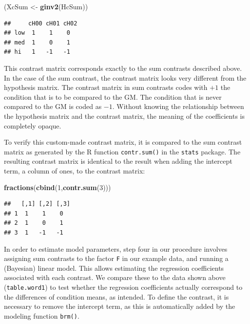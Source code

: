 \documentclass[12pt,]{krantz}
\newenvironment{Shaded}{\begin{snugshade}}{\end{snugshade}}
\newcommand{\DecValTok}[1]{\textcolor[rgb]{0.00,0.00,0.81}{#1}}
\newcommand{\KeywordTok}[1]{\textcolor[rgb]{0.13,0.29,0.53}{\textbf{#1}}}
\newcommand{\NormalTok}[1]{#1}
\newcommand{\StringTok}[1]{\textcolor[rgb]{0.31,0.60,0.02}{#1}}
\theoremstyle{definition}
\theoremstyle{definition}
\theoremstyle{definition}
\theoremstyle{remark}
\begin{document}
\begin{Shaded}
\begin{Highlighting}[]
\NormalTok{(XcSum <-}\StringTok{ }\KeywordTok{ginv2}\NormalTok{(HcSum))}
\end{Highlighting}
\end{Shaded}

\begin{verbatim}
##     cH00 cH01 cH02
## low  1    1    0  
## med  1    0    1  
## hi   1   -1   -1
\end{verbatim}

This contrast matrix corresponds exactly to the sum contrasts described above. In the case of the sum contrast, the contrast matrix looks very different from the hypothesis matrix. The contrast matrix in sum contrasts codes with \(+1\) the condition that is to be compared to the GM. The condition that is never compared to the GM is coded as \(-1\). Without knowing the relationship between the hypothesis matrix and the contrast matrix, the meaning of the coefficients is completely opaque.

To verify this custom-made contrast matrix, it is compared to the sum contrast matrix as generated by the R function \texttt{contr.sum()} in the \texttt{stats} package. The resulting contrast matrix is identical to the result when adding the intercept term, a column of ones, to the contrast matrix:

\begin{Shaded}
\begin{Highlighting}[]
\KeywordTok{fractions}\NormalTok{(}\KeywordTok{cbind}\NormalTok{(}\DecValTok{1}\NormalTok{,}\KeywordTok{contr.sum}\NormalTok{(}\DecValTok{3}\NormalTok{)))}
\end{Highlighting}
\end{Shaded}

\begin{verbatim}
##   [,1] [,2] [,3]
## 1  1    1    0  
## 2  1    0    1  
## 3  1   -1   -1
\end{verbatim}

In order to estimate model parameters, step four in our procedure involves assigning sum contrasts to the factor \texttt{F} in our example data, and running a (Bayesian) linear model. This allows estimating the regression coefficients associated with each contrast. We compare these to the data shown above (\texttt{table.word1}) to test whether the regression coefficients actually correspond to the differences of condition means, as intended. To define the contrast, it is necessary to remove the intercept term, as this is automatically added by the modeling function \texttt{brm()}.
\end{document}
